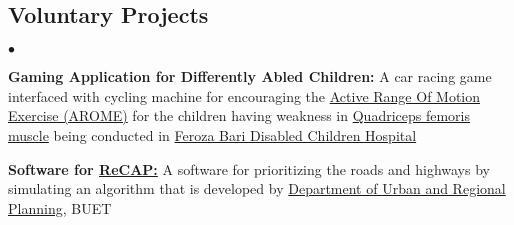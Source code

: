 \documentclass[margin,line]{res}
\newenvironment{list2}{
  \begin{list}{$\bullet$}{%
      \setlength{\itemsep}{0in}
      \setlength{\parsep}{0in} \setlength{\parskip}{0in}
      \setlength{\topsep}{0in} \setlength{\partopsep}{0in} 
      \setlength{\leftmargin}{0.2in}}}{\end{list}}
\begin{document}
\begin{resume}
\section{\sc Voluntary Projects}
\begin{list2}
\item {\bf {Gaming Application for Differently Abled Children:}} A car racing game interfaced with cycling machine for encouraging the \href{http://www.physiotherapynotes.com/2011/07/physiotherapy-exercises-types.html}{Active Range Of Motion Exercise (AROME)} for the children having weakness in \href{https://en.wikipedia.org/wiki/Quadriceps_femoris_muscle}{Quadriceps femoris muscle} being conducted in \href{http://www.bccw-bd.org/information_about.html}{Feroza Bari Disabled Children Hospital}
\item {\bf Software for \href{http://www.research4cap.org/SitePages/Home.aspx}{ReCAP:}} A software for prioritizing the roads and highways by simulating an algorithm that is developed by \href{http://urp.buet.ac.bd/}{Department of Urban and Regional Planning}, BUET
\end{list2}

\end{resume}
\end{document}
